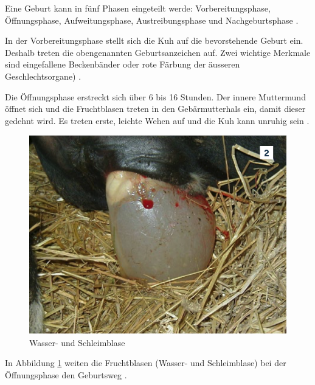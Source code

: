 Eine Geburt kann in fünf Phasen eingeteilt werde: Vorbereitungsphase, Öffnungsphase, Aufweitungsphase, Austreibungsphase und Nachgeburtsphase \citep[S. 6-8 ]{Traulsen2013}.

In der Vorbereitungsphase stellt sich die Kuh auf die bevorstehende Geburt ein. Deshalb treten die obengenannten Geburtsanzeichen auf. Zwei wichtige Merkmale sind eingefallene Beckenbänder oder rote Färbung der äusseren Geschlechtsorgane) \citep[S. 6 ]{Traulsen2013}.  

Die Öffnungsphase erstreckt sich über 6 bis 16 Stunden. Der innere Muttermund öffnet sich und die Fruchtblasen treten in den Gebärmutterhals ein, damit dieser gedehnt wird. Es treten erste, leichte Wehen auf und die Kuh kann unruhig sein \citep[S. 7 ]{Traulsen2013}.  

\begin{figure}[H]
	\center
	\includegraphics[scale=.45]{Grafiken/oeffnungsphase.png}
	\caption{Wasser- und Schleimblase}
	\label{fig: Öffnungsphase}
\end{figure}

In Abbildung \ref{fig: Öffnungsphase} weiten die Fruchtblasen (Wasser- und Schleimblase) bei der Öffnungsphase den Geburtsweg \citep[S. 7 ]{Traulsen2013}. 


